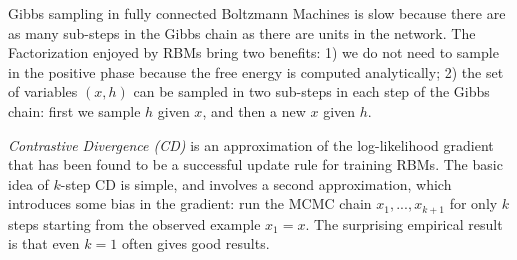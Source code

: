Gibbs sampling in fully connected Boltzmann Machines is slow because there are as many sub-steps in the Gibbs chain as there are units in the network. The Factorization enjoyed by RBMs bring two benefits: 1) we do not need to sample in the positive phase because the free energy is computed analytically; 2) the set of variables $(x,h)$ can be sampled in two sub-steps in each step of the Gibbs chain: first we sample $h$ given $x$, and then a new $x$ given $h$.

\emph{Contrastive Divergence (CD)} is an approximation of the log-likelihood gradient that has been found to be a successful update rule for training RBMs. The basic idea of $k$-step CD is simple, and involves a second approximation, which introduces some bias in the gradient: run the MCMC chain $x_1, ..., x_{k+1}$ for only $k$ steps starting from the observed example $x_1 = x$. The surprising empirical result is that even $k=1$ often gives good results.

